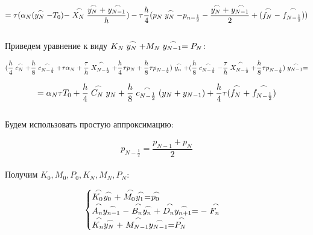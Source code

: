 \documentclass[a4paper,oneside,12pt]{extreport}
\begin{document}
\begin{equation}
	= \tau (\alpha_{N} (\buildrel\,\,\frown\over{y_{N}} - T_{0}) - \buildrel\,\,\frown\over{X_{N}} \frac{\buildrel\,\,\frown\over{y_{N}} + \buildrel\,\,\frown\over{y_{N - 1}}}{h}) - \tau \frac{h}{4} (p_{N}\buildrel\,\,\frown\over{y_{N}} - p_{n - \frac{1}{2} } - \frac{\buildrel\,\,\frown\over{y_{N}} + \buildrel\,\,\frown\over{y_{N - 1}}}{2} + (\buildrel\,\,\frown\over{f_{N}} - \buildrel\,\,\frown\over{f_{N - \frac{1}{2}}}))
\end{equation}\\

Приведем уравнение к виду $K_{N} \buildrel\,\,\frown\over{y_{N}} + M_{N} \buildrel\,\,\frown\over {y_{N - 1}} = P_{N}$:

\begin{equation*}
	(\frac{h}{4} \buildrel\,\,\frown\over{c_{N}} + \frac{h}{8} \buildrel\,\,\frown\over{c_{N - \frac{1}{2}}} + \tau \alpha_{N} + \frac{\tau}{h} \buildrel\,\,\frown\over{X_{N - \frac{1}{2}}} + \frac{h}{4} \tau p_{N} + \frac{h}{8} \tau p_{N - \frac{1}{2}}) \buildrel\,\,\frown\over{y_{n}} + (\frac{h}{8} \buildrel\,\,\frown\over{c_{N - \frac{1}{2}}} - \frac{\tau}{h} \buildrel\,\,\frown\over{X_{N - \frac{1}{2}}} + \frac{h}{8} \tau p_{N - \frac{1}{2}}) \buildrel\,\,\frown\over{y_{N - 1}} =
\end{equation*}

\begin{equation}
	= \alpha_{N} \tau T_{0} + \frac{h}{4} \buildrel\,\,\frown\over{C_{N}}y_{N} + \frac{h}{8} \buildrel\,\,\frown\over{c_{N - \frac{1}{2}}} (y_{N} + y_{N - 1}) + \frac{h}{4} \tau (\buildrel\,\,\frown\over{f_{N}} + \buildrel\,\,\frown\over{f_{N - \frac{1}{2}}})
\end{equation}\\

Будем использовать простую аппроксимацию:

\begin{equation}
	p_{N - \frac{1}{2}} = \frac{p_{N - 1} + p_{N}}{2}
\end{equation}\\

Получим $K_{0}, M_{0}, P_{0}, K_{N}, M_{N}, P_{N}$:

\begin{equation}
	\begin{cases}\buildrel\,\,\frown\over{K_{0}} \buildrel\,\,\frown\over{y_{0}} + \buildrel\,\,\frown\over{M_{0}} \buildrel\,\,\frown\over{y_{1}} = \buildrel\,\,\frown\over{p_{0}}
		\\ \buildrel\,\,\frown\over{A_{n}}\buildrel\,\,\frown\over{y_{n - 1}} - \buildrel\,\,\frown\over{B_{n}} \buildrel\,\,\frown\over{y_{n}} + \buildrel\,\,\frown\over{D_{n}} \buildrel\,\,\frown\over{y_{n + 1}} = - \buildrel\,\,\frown\over{F_{n}}
		\\ \buildrel\,\,\frown\over{K_{n}} \buildrel\,\,\frown\over{y_{N}} + \buildrel\,\,\frown\over{M_{N - 1}} \buildrel\,\,\frown\over{y_{N - 1}} = \buildrel\,\,\frown\over{P_{N}}
	\end{cases}
\end{equation}\\
\end{document}
